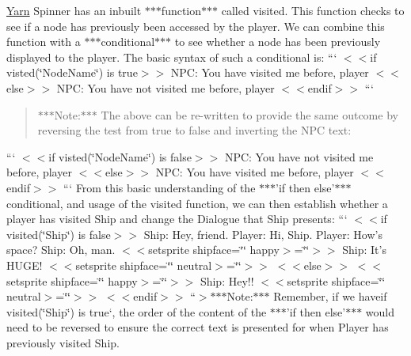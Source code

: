 \hyperlink{a00051}{Yarn} Spinner has an inbuilt $\ast$$\ast$$\ast$function$\ast$$\ast$$\ast$ called {\ttfamily visited}. This function checks to see if a node has previously been accessed by the player. We can combine this function with a $\ast$$\ast$$\ast$conditional$\ast$$\ast$$\ast$ to see whether a node has been previously displayed to the player. The basic syntax of such a conditional is\-: ``` $<$$<$if visted(\char`\"{}\-Node\-Name\char`\"{}) is true$>$$>$ N\-P\-C\-: You have visited me before, player $<$$<$else$>$$>$ N\-P\-C\-: You have not visited me before, player $<$$<$endif$>$$>$ ``` \begin{quotation}
$\ast$$\ast$$\ast$\-Note\-:$\ast$$\ast$$\ast$ The above can be re-\/written to provide the same outcome by reversing the test from true to false and inverting the N\-P\-C text\-:

\end{quotation}
``` $<$$<$if visted(\char`\"{}\-Node\-Name\char`\"{}) is false$>$$>$ N\-P\-C\-: You have not visited me before, player $<$$<$else$>$$>$ N\-P\-C\-: You have visited me before, player $<$$<$endif$>$$>$ ``` From this basic understanding of the $\ast$$\ast$$\ast$'if then else'$\ast$$\ast$$\ast$ conditional, and usage of the {\ttfamily visited} function, we can then establish whether a player has visited Ship and change the Dialogue that Ship presents\-: ``` $<$$<$if visited(\char`\"{}\-Ship\char`\"{}) is false$>$$>$ Ship\-: Hey, friend. Player\-: Hi, Ship. Player\-: How's space? Ship\-: Oh, man. $<$$<$setsprite shipface=\char`\"{}\char`\"{} happy$>$=\char`\"{}\char`\"{}$>$$>$ Ship\-: It's H\-U\-G\-E! $<$$<$setsprite shipface=\char`\"{}\char`\"{} neutral$>$=\char`\"{}\char`\"{}$>$$>$ $<$$<$else$>$$>$ $<$$<$setsprite shipface=\char`\"{}\char`\"{} happy$>$=\char`\"{}\char`\"{}$>$$>$ Ship\-: Hey!! $<$$<$setsprite shipface=\char`\"{}\char`\"{} neutral$>$=\char`\"{}\char`\"{}$>$$>$ $<$$<$endif$>$$>$ ``{\ttfamily  $>$$\ast$$\ast$$\ast$\-Note\-:$\ast$$\ast$$\ast$ Remember, if we have}if visited(\char`\"{}\-Ship\char`\"{}) is true`, the order of the content of the $\ast$$\ast$$\ast$'if then else'$\ast$$\ast$$\ast$ would need to be reversed to ensure the correct text is presented for when Player has previously visited Ship.

